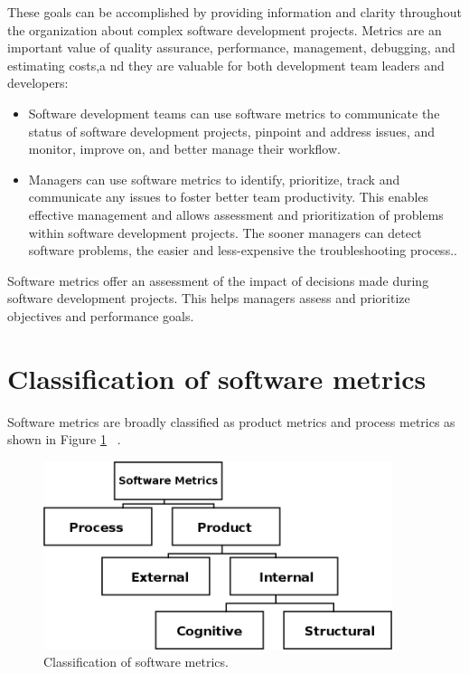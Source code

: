 These goals can be accomplished by providing information and clarity throughout the organization about complex software development projects. Metrics are an important value of quality assurance, performance, management, debugging, and estimating costs,a nd they are valuable for both development team leaders and developers:

\begin{itemize}
	\item Software development teams can use software metrics to communicate the status of
	software development projects, pinpoint and address issues, and monitor, improve on,
	and better manage their workflow.
	\item Managers can use software metrics to identify, prioritize, track and communicate any
	issues to foster better team productivity. This enables effective management and allows
	assessment and prioritization of problems within software development projects. The
	sooner managers can detect software problems, the easier and less-expensive the
	troubleshooting process..
\end{itemize}

Software metrics offer an assessment of the impact of decisions made during software development projects. This helps managers assess and prioritize objectives and performance goals.

\section{Classification of software metrics}

Software metrics are broadly classified as product metrics and process metrics as shown in Figure \ref{fig:classification} ~\cite{metrics2}.
\begin{figure}[h]
	\centering
	\includegraphics[height=55mm]{figures/classification.png}
	\caption{Classification of software metrics.}
	\label{fig:classification}
\end{figure}

